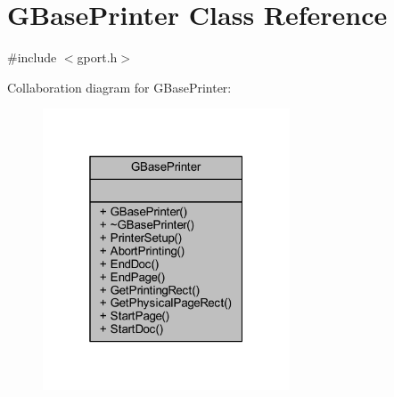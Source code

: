 \hypertarget{class_g_base_printer}{}\section{G\+Base\+Printer Class Reference}
\label{class_g_base_printer}


{\ttfamily \#include $<$gport.\+h$>$}



Collaboration diagram for G\+Base\+Printer\+:\nopagebreak
\begin{figure}[H]
\begin{center}
\leavevmode
\includegraphics[width=208pt]{class_g_base_printer__coll__graph}
\end{center}
\end{figure}
